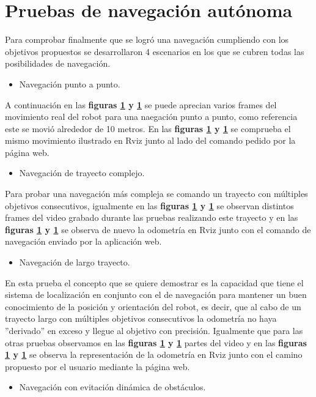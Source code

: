 \section{Pruebas de navegación autónoma}

Para comprobar finalmente que se logró una navegación cumpliendo con los objetivos propuestos se desarrollaron 4 escenarios en los que se cubren todas 
las posibilidades de navegación.
\begin{itemize}
  \item Navegación punto a punto.
\end{itemize}
A continuación en las \textbf{figuras \ref{} y \ref{}} se puede aprecian varios frames del movimiento real del robot para una naegación punto a punto, como referencia este se movió alrededor de 10 metros. En 
las \textbf{figuras \ref{} y \ref{}} se comprueba el mismo movimiento ilustrado en Rviz junto al lado del comando pedido por la página web.

\begin{itemize}
  \item Navegación de trayecto complejo.
\end{itemize}
Para probar una navegación más compleja se comando un trayecto con múltiples objetivos consecutivos, igualmente en las \textbf{figuras \ref{} y \ref{}} se observan distintos frames 
del video grabado durante las pruebas realizando este trayecto y en las \textbf{figuras \ref{} y \ref{}} se observa de nuevo la odometría en Rviz junto con el comando de navegación enviado por la 
aplicación web.

\begin{itemize}
  \item Navegación de largo trayecto.
\end{itemize}
En esta prueba el concepto que se quiere demostrar es la capacidad que tiene el sistema de localización en conjunto con el de navegación para mantener un 
buen conocimiento de la posición y orientación del robot, es decir, que al cabo de un trayecto largo con múltiples objetivos consecutivos la odometría no haya ''derivado'' en 
exceso y llegue al objetivo con precisión.
Igualmente que para las otras pruebas observamos en las \textbf{figuras \ref{} y \ref{}} partes del video y en las \textbf{figuras \ref{} y \ref{}} se observa 
la representación de la odometría en Rviz junto con el camino propuesto por el usuario mediante la página web.
\begin{itemize}
  \item Navegación con evitación dinámica de obstáculos.
\end{itemize}

